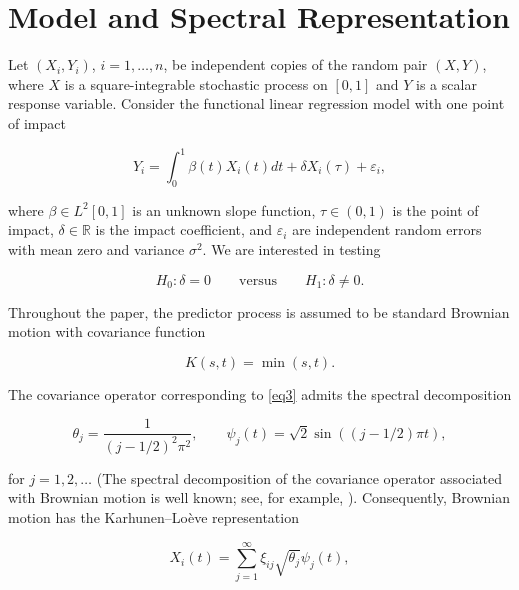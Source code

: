 \documentclass[twoside]{article}
\begin{document}
	
	\section{Model and Spectral Representation}\label{sec2}
	
	Let $(X_i,Y_i)$, $i=1,\ldots,n$, be independent copies of the random pair $(X,Y)$, where $X$ is a square-integrable stochastic process on $[0,1]$ and $Y$ is a scalar response variable. Consider the functional linear regression model with one point of impact
	
	\begin{equation}\label{eq1}
		Y_i=\int_0^1 \beta(t)X_i(t)dt+\delta X_i(\tau)+\varepsilon_i,
	\end{equation}
	
	where $\beta\in L^2[0,1]$ is an unknown slope function, $\tau\in(0,1)$ is the point of impact, $\delta\in\mathbb{R}$ is the impact coefficient, and $\varepsilon_i$ are independent random errors with mean zero and variance $\sigma^2$. We are interested in testing
	
	\begin{equation}\label{eq2}
		H_0:\delta=0
		\qquad
		\text{versus}
		\qquad
		H_1:\delta\neq0.
	\end{equation}
	
	Throughout the paper, the predictor process is assumed to be standard Brownian motion with covariance function
	
	\begin{equation}\label{eq3}
		K(s,t)=\min(s,t).
	\end{equation}
	
	The covariance operator corresponding to \eqref{eq3} admits the spectral decomposition
	
	\begin{equation}\label{eq4}
		\theta_j=\frac{1}{(j-1/2)^2\pi^2},
		\qquad
		\psi_j(t)=\sqrt{2}\sin((j-1/2)\pi t),
	\end{equation}
	
	for $j=1,2,\ldots$ (The spectral decomposition of the covariance operator associated with Brownian motion is well known; see, for example, \citealp{Ash1975}). Consequently, Brownian motion has the Karhunen--Lo\`eve representation
	
	\begin{equation}\label{eq5}
		X_i(t)=\sum_{j=1}^{\infty}\xi_{ij}\sqrt{\theta_j}\psi_j(t),
	\end{equation}
	
\end{document}
